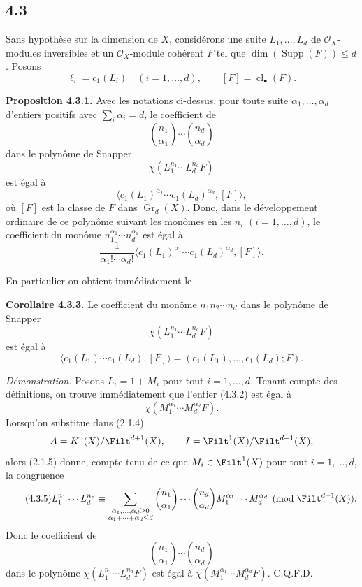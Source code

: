 \documentclass[11pt]{article}
\newcommand{\Gr}{\operatorname{Gr}}
\newcommand{\cl}{\operatorname{cl}}
\providecommand{\Gr}{\operatorname{Gr}}
\providecommand{\Supp}{\operatorname{Supp}}
\providecommand{\Gr}{\operatorname{G}}
\begin{document}
\subsection*{4.3}
Sans hypothèse sur la dimension de \(X\), considérons une suite \(L_1,\ldots,L_d\) de \(\mathcal O_X\)-modules inversibles et un \(\mathcal O_X\)-module cohérent \(F\) tel que \(\dim(\Supp(F))\leq d\). Posons
\[
 \ell_i=c_1(L_i)\quad(i=1,\ldots,d),\qquad [F]=\cl_\bullet(F).
\]

\textbf{Proposition 4.3.1.} Avec les notations ci-dessus, pour toute suite \(\alpha_1,\ldots,\alpha_d\) d'entiers positifs avec \(\sum_i\alpha_i=d\), le coefficient de
\[
 \binom{n_1}{\alpha_1}\cdots\binom{n_d}{\alpha_d}
\]
dans le polynôme de Snapper
\[
 \chi(L_1^{n_1}\cdots L_d^{n_d}F)
\]
est égal à
\begin{equation}\tag{4.3.2}
 \bigl\langle c_1(L_1)^{\alpha_1}\cdots c_1(L_d)^{\alpha_d},[F]\bigr\rangle,
\end{equation}
où \([F]\) est la classe de \(F\) dans \(\Gr_d(X)\). Donc, dans le développement ordinaire de ce polynôme suivant les monômes en les \(n_i\) \((i=1,\ldots,d)\), le coefficient du monôme \(n_1^{\alpha_1}\cdots n_d^{\alpha_d}\) est égal à
\[
 \frac{1}{\alpha_1!\cdots\alpha_d!}
 \bigl\langle c_1(L_1)^{\alpha_1}\cdots c_1(L_d)^{\alpha_d},[F]\bigr\rangle.
\]

En particulier on obtient immédiatement le

\textbf{Corollaire 4.3.3.} Le coefficient du monôme \(n_1n_2\cdots n_d\) dans le polynôme de Snapper
\[
 \chi(L_1^{n_1}\cdots L_d^{n_d}F)
\]
est égal à
\begin{equation}\tag{4.3.4}
 \bigl\langle c_1(L_1)\cdots c_1(L_d),[F]\bigr\rangle
 =
 (c_1(L_1),\ldots,c_1(L_d);F).
\end{equation}

\emph{Démonstration.} Posons \(L_i=1+M_i\) pour tout \(i=1,\ldots,d\). Tenant compte des définitions, on trouve immédiatement que l'entier (4.3.2) est égal à
\[
 \chi(M_1^{\alpha_1}\cdots M_d^{\alpha_d}F).
\]
Lorsqu'on substitue dans (2.1.4)
\[
 A=K^\circ(X)/\Filt^{d+1}(X),\qquad
 I=\Filt^1(X)/\Filt^{d+1}(X),
\]
alors (2.1.5) donne, compte tenu de ce que \(M_i\in\Filt^1(X)\) pour tout \(i=1,\ldots,d\), la congruence
\begin{equation}\tag{4.3.5}
 L_1^{n_1}\cdots L_d^{n_d}
 \equiv
 \sum_{\substack{\alpha_1,\ldots,\alpha_d\geq0\\ \alpha_1+\cdots+\alpha_d\leq d}}
 \binom{n_1}{\alpha_1}\cdots\binom{n_d}{\alpha_d}
 M_1^{\alpha_1}\cdots M_d^{\alpha_d}
 \pmod{\Filt^{d+1}(X)}.
\end{equation}
Donc le coefficient de
\[
 \binom{n_1}{\alpha_1}\cdots\binom{n_d}{\alpha_d}
\]
dans le polynôme \(\chi(L_1^{n_1}\cdots L_d^{n_d}F)\) est égal à \(\chi(M_1^{\alpha_1}\cdots M_d^{\alpha_d}F)\). C.Q.F.D.
\end{document}
